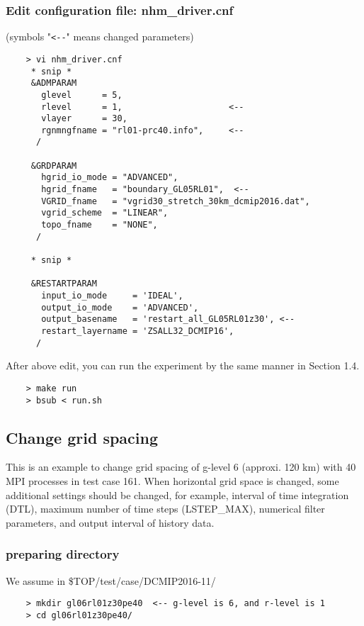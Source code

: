 \documentclass[a4paper]{article}
\begin{document}
\subsubsection{Edit configuration file: nhm\_driver.cnf}
 (symbols "\verb|<--|" means changed parameters)
 \begin{verbatim}
    > vi nhm_driver.cnf
     * snip *
     &ADMPARAM
       glevel      = 5,
       rlevel      = 1,                     <--
       vlayer      = 30,
       rgnmngfname = "rl01-prc40.info",     <--
      /

     &GRDPARAM
       hgrid_io_mode = "ADVANCED",
       hgrid_fname   = "boundary_GL05RL01",  <--
       VGRID_fname   = "vgrid30_stretch_30km_dcmip2016.dat",
       vgrid_scheme  = "LINEAR",
       topo_fname    = "NONE",
      /

     * snip *

     &RESTARTPARAM
       input_io_mode     = 'IDEAL',
       output_io_mode    = 'ADVANCED',
       output_basename   = 'restart_all_GL05RL01z30', <--
       restart_layername = 'ZSALL32_DCMIP16',
      /
 \end{verbatim}

 \noindent After above edit, you can run the experiment
 by the same manner in Section 1.4.
 \begin{verbatim}
    > make run
    > bsub < run.sh
 \end{verbatim}


\subsection{Change grid spacing}
 \noindent This is an example to change grid spacing of g-level 6
 (approxi. 120 km) with 40 MPI processes in test case 161.
 When horizontal grid space is changed, some additional settings
 should be changed, for example, interval of time integration (DTL),
 maximum number of time steps (LSTEP\_MAX), numerical filter parameters,
 and output interval of history data.

\subsubsection{preparing directory}
 We assume in \${TOP}/test/case/DCMIP2016-11/
 \begin{verbatim}
    > mkdir gl06rl01z30pe40  <-- g-level is 6, and r-level is 1
    > cd gl06rl01z30pe40/
 \end{verbatim}
\end{document}

